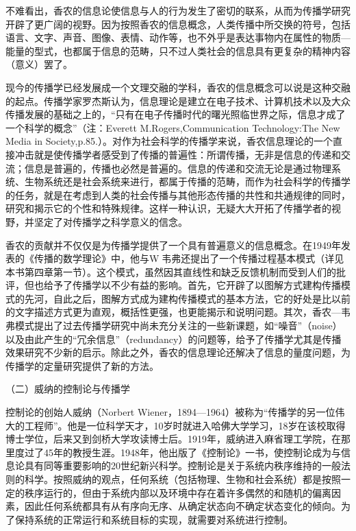 \documentclass[UTF8,12pt]{ctexart}
\numberwithin{equation}{section} %
\numberwithin{figure}{section}
\numberwithin{table}{section}
\begin{document}
	不难看出，香农的信息论使信息与人的行为发生了密切的联系，从而为传播学研究开辟了更广阔的视野。因为按照香农的信息概念，人类传播中所交换的符号，包括语言、文字、声音、图像、表情、动作等，也不外乎是表达事物内在属性的物质—能量的型式，也都属于信息的范畴，只不过人类社会的信息具有更复杂的精神内容（意义）罢了。
	
	现今的传播学已经发展成一个文理交融的学科，香农的信息概念可以说是这种交融的起点。传播学家罗杰斯认为，信息理论是建立在电子技术、计算机技术以及大众传播发展的基础之上的，“只有在电子传播时代的曙光照临世界之际，信息才成了一个科学的概念”（注：Everett M.Rogers,Communication Technology:The New Media in Society,p.85.）。对作为社会科学的传播学来说，香农信息理论的一个直接冲击就是使传播学者感受到了传播的普遍性：所谓传播，无非是信息的传递和交流；信息是普遍的，传播也必然是普遍的。信息的传递和交流无论是通过物理系统、生物系统还是社会系统来进行，都属于传播的范畴，而作为社会科学的传播学的任务，就是在考虑到人类的社会传播与其他形态传播的共性和共通规律的同时，研究和揭示它的个性和特殊规律。这样一种认识，无疑大大开拓了传播学者的视野，并坚定了对传播学之科学意义的信念。
	
	香农的贡献并不仅仅是为传播学提供了一个具有普遍意义的信息概念。在1949年发表的《传播的数学理论》中，他与W韦弗还提出了一个传播过程基本模式（详见本书第四章第一节）。这个模式，虽然因其直线性和缺乏反馈机制而受到人们的批评，但也给予了传播学以不少有益的影响。首先，它开辟了以图解方式建构传播模式的先河，自此之后，图解方式成为建构传播模式的基本方法，它的好处是比以前的文字描述方式更为直观，概括性更强，也更能揭示和说明问题。其次，香农—韦弗模式提出了过去传播学研究中尚未充分关注的一些新课题，如“噪音”（noise）以及由此产生的“冗余信息”（redundancy）的问题等，给予了传播学尤其是传播效果研究不少新的启示。除此之外，香农的信息理论还解决了信息的量度问题，为传播学的定量研究提供了新的方法。
	
	（二）威纳的控制论与传播学
	
	控制论的创始人威纳（Norbert Wiener，1894—1964）被称为“传播学的另一位伟大的工程师”。他是一位科学天才，10岁时就进入哈佛大学学习，18岁在该校取得博士学位，后来又到剑桥大学攻读博士后。1919年，威纳进入麻省理工学院，在那里度过了45年的教授生涯。1948年，他出版了《控制论》一书，使控制论成为与信息论具有同等重要影响的20世纪新兴科学。控制论是关于系统内秩序维持的一般法则的科学。按照威纳的观点，任何系统（包括物理、生物和社会系统）都是按照一定的秩序运行的，但由于系统内部以及环境中存在着许多偶然的和随机的偏离因素，因此任何系统都具有从有序向无序、从确定状态向不确定状态变化的倾向。为了保持系统的正常运行和系统目标的实现，就需要对系统进行控制。
	
\end{document}

